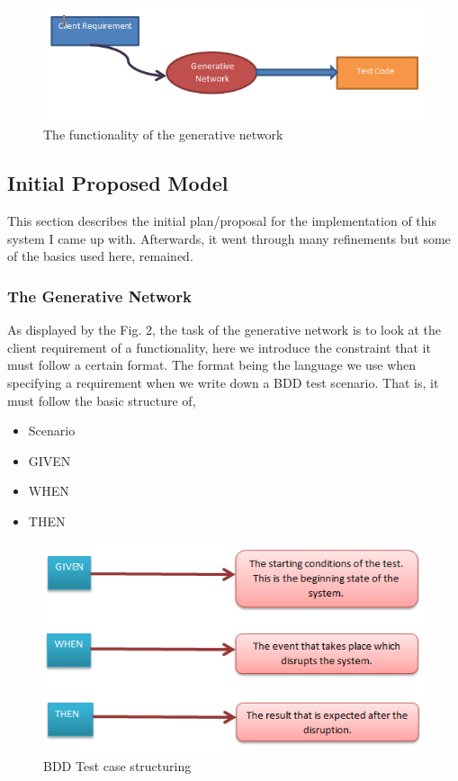 \documentclass[conference]{IEEEtran}
\begin{document}
\begin{figure}
	\includegraphics[width=\linewidth]{Generative_network.png}
	\caption{The functionality of the generative network}
	\label{fig2}
\end{figure}

\subsection{Initial Proposed Model}
This section describes the initial plan/proposal for the implementation of this system I came up with. Afterwards, it went through many refinements but some of the basics used here, remained.

\subsubsection{The Generative Network}
As displayed by the Fig. 2, the task of the generative network is to look at the client requirement of a functionality, here we introduce the constraint that it must follow a certain format. The format being the language we use when specifying a requirement when we write down a BDD test scenario. That is, it must follow the basic structure of,

\begin{itemize}
	\item Scenario
	\item GIVEN
	\item WHEN
	\item THEN
\end{itemize}

\begin{figure}
	\includegraphics[width=\linewidth]{Given_when_then.png}
	\caption{BDD Test case structuring}
	\label{fig3}
\end{figure}
\end{document}
